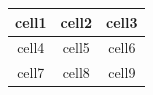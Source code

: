 ﻿\begin{tabular}{ |c|c|c| }
    \hline
    \textbf{cell1} & cell2 & cell3 \\
    \hline
    cell4 & cell5 & cell6 \\
    \hline
    cell7 & cell8 & cell9 \\
    \hline
\end{tabular}